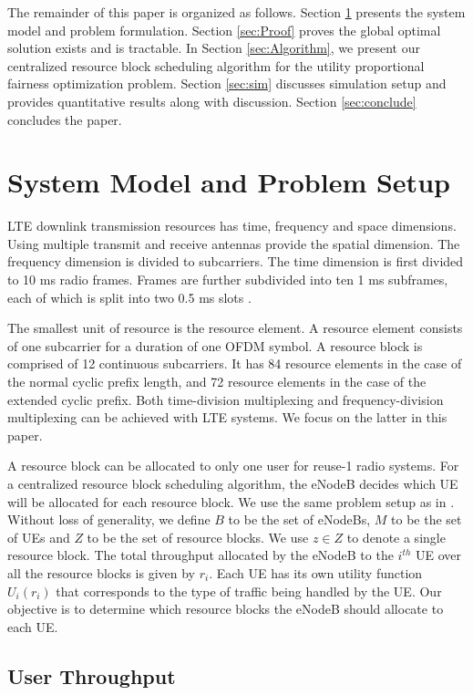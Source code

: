 \documentclass[conference]{IEEEtran}
\begin{document}
The remainder of this paper is organized as follows. Section \ref{sec:Problem_formulation} presents the system model and problem formulation. Section \ref{sec:Proof} proves the global optimal solution exists and is tractable. In Section \ref{sec:Algorithm}, we present our centralized resource block scheduling algorithm for the utility proportional fairness optimization problem. Section \ref{sec:sim} discusses simulation setup and provides quantitative results along with discussion. Section \ref{sec:conclude} concludes the paper.

\section{System Model and Problem Setup}\label{sec:Problem_formulation}
LTE downlink transmission resources has time, frequency and space dimensions. Using multiple transmit and receive antennas provide the spatial dimension. The frequency dimension is divided to subcarriers. The time dimension is first divided to 10 ms radio frames. Frames are further subdivided into ten 1 ms subframes, each of which is split into two 0.5 ms slots \cite{LTEBook}. 

The smallest unit of resource is the resource element. A resource element consists of one subcarrier for a duration of one OFDM symbol. A resource block is comprised of 12 continuous subcarriers. It has 84 resource elements in the case of the normal cyclic prefix length, and 72 resource elements in the case of the extended cyclic prefix. Both time-division multiplexing and frequency-division multiplexing can be achieved with LTE systems. We focus on the latter in this paper. 

A resource block can be allocated to only one user for reuse-1 radio systems. For a centralized resource block scheduling algorithm, the eNodeB decides which UE will be allocated for each resource block. We use the same problem setup as in \cite{SelfOrganizedLTE}. Without loss of generality, we define $B$ to be the set of eNodeBs, $M$ to be the set of UEs and $Z$ to be the set of resource blocks. We use $z \in Z$ to denote a single resource block. The total throughput allocated by the eNodeB to the $i^{th}$ UE over all the resource blocks is given by $r_i$. Each UE has its own utility function $U_i(r_i)$ that corresponds to the type of traffic being handled by the UE. Our objective is to determine which resource blocks the eNodeB should allocate to each UE. 

\subsection{User Throughput}\label{sec:throughput}
\end{document}
